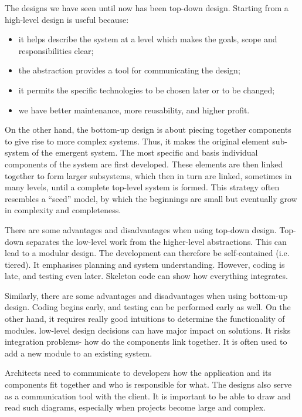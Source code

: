 \documentclass[a4paper, openany]{memoir}
\begin{document}
\noindent The designs we have seen until now has been top-down design. Starting from a high-level design is useful because:
\begin{itemize}
    \item it helps describe the system at a level which makes the goals, scope and responsibilities clear;
    \item the abstraction provides a tool for communicating the design;
    \item it permits the specific technologies to be chosen later or to be changed;
    \item we have better maintenance, more reusability, and higher profit.
\end{itemize}
On the other hand, the bottom-up design is about piecing together components to give rise to more complex systems. Thus, it makes the original element sub-system of the emergent system. The most specific and basis individual components of the system are first developed. These elements are then linked together to form larger subsystems, which then in turn are linked, sometimes in many levels, until a complete top-level system is formed. This strategy often resembles a ``seed'' model, by which the beginnings are small but eventually grow in complexity and completeness.

\noindent There are some advantages and disadvantages when using top-down design. Top-down separates the low-level work from the higher-level abstractions. This can lead to a modular design. The development can therefore be self-contained (i.e. tiered). It emphasises planning and system understanding. However, coding is late, and testing even later. Skeleton code can show how everything integrates.

\noindent Similarly, there are some advantages and disadvantages when using bottom-up design. Coding begins early, and testing can be performed early as well. On the other hand, it requires really good intuitions to determine the functionality of modules. low-level design decisions can have major impact on solutions. It risks integration problems- how do the components link together. It is often used to add a new module to an existing system.

\noindent Architects need to communicate to developers how the application and its components fit together and who is responsible for what. The designs also serve as a communication tool with the client. It is important to be able to draw and read such diagrams, especially when projects become large and complex.
\end{document}
